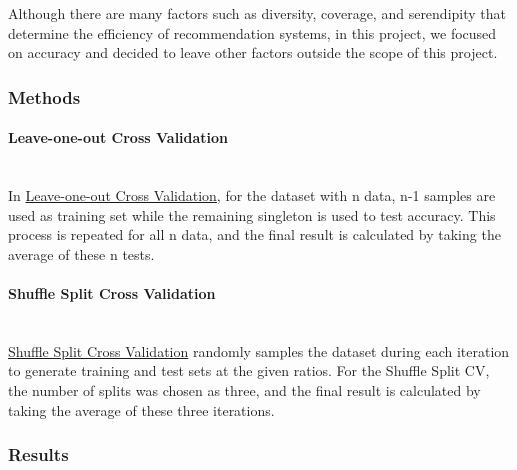 	Although there are many factors such as diversity, coverage, and serendipity that determine the efficiency of recommendation systems, in this project, we focused on accuracy and decided to leave other factors outside the scope of this project.
\subsubsection{Methods}
\paragraph{Leave-one-out Cross Validation} \mbox{} \\
In 	 \href{https://surprise.readthedocs.io/en/stable/model_selection.html#surprise.model_selection.split.LeaveOneOut}{Leave-one-out Cross Validation}, for the dataset with n data, n-1 samples are used as training set while the remaining singleton is used to test accuracy. This process is repeated for all n data, and the final result is calculated by taking the average of these n tests.

\paragraph{Shuffle Split Cross Validation} \mbox{} \\
\href{https://surprise.readthedocs.io/en/stable/model_selection.html#surprise.model_selection.split.ShuffleSplit}{Shuffle Split Cross Validation} randomly samples the dataset during each iteration to generate training and test sets at the given ratios. For the Shuffle Split CV, the number of splits was chosen as three, and the final result is calculated by taking the average of these three iterations.

\subsubsection{Results}
